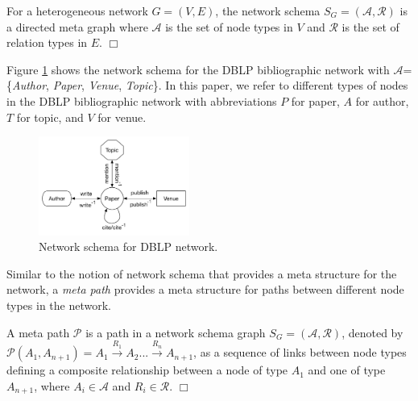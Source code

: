 \begin{definition}For a heterogeneous network $G=(V,E)$, the network schema $S_G=\mathcal{(A,R)}$ is a directed meta graph where $\mathcal{A}$ is the set of node types in $V$ and $\mathcal{R}$ is the set of relation types in $E$.  $\Box$\end{definition}

Figure \ref{schema} shows the network schema for the DBLP bibliographic network with $\mathcal{A}$=\{\textit{Author}, \textit{Paper}, \textit{Venue}, \textit{Topic}\}. In this paper, we refer to different types of nodes in the DBLP bibliographic network with abbreviations $P$ for paper, $A$ for author, $T$ for topic, and $V$ for venue. 

\begin{figure}[t]
\centering
\includegraphics[trim = 0mm 10mm 0mm 0mm,width=0.44\textwidth]{figs/schema.pdf}
\caption{Network schema for DBLP network.}\label{schema}
\end{figure}


Similar to the notion of network schema that provides a meta structure for the network, a \textit{meta path} \cite{sun2011pathsim} provides a meta structure for paths between different node types in the network. 

\begin{definition}A meta path $\mathcal{P}$ is a path in a network schema graph $S_G = (\mathcal{A,R})$, denoted by $\mathcal{P}(A_1,A_{n+1}) = A_1 \xrightarrow{R_1} A_2... \xrightarrow{R_n} A_{n+1}$, as a sequence of links between node types defining a composite relationship between a node of type $A_1$ and one of type $A_{n+1}$, where $A_i \in \mathcal{A}$ and $R_i \in \mathcal{R}$. $\Box$\end{definition}

